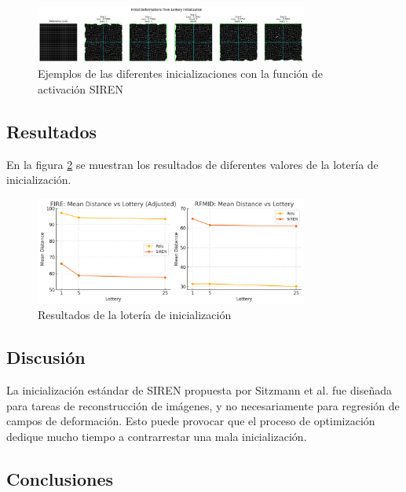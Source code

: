 \begin{figure}[tbp]
    \centering
    \includegraphics[width=0.8\textwidth]{imaxes/lottery/initial_deformations_combinedSIREN.png}
    \caption{Ejemplos de las diferentes inicializaciones con la función de activación SIREN}
    \label{fig:lottery_initial_deformations_combinedSIREN}
\end{figure}

\subsection{Resultados}
\label{subsec:Resultados-initialization}

En la figura \ref{fig:lottery} se muestran los resultados de diferentes valores de la lotería de inicialización.

\begin{figure}[tbp]
    \centering
    \includegraphics[width=0.8\textwidth]{imaxes/lottery/lotery.png}
    \caption{Resultados de la lotería de inicialización}
    \label{fig:lottery}
\end{figure}

\subsection{Discusión}
\label{subsec:Discusion-initialization}

La inicialización estándar de SIREN propuesta por Sitzmann et al. \cite{sitzmann2020implicitneuralrepresentationsperiodic} fue diseñada para tareas de reconstrucción de imágenes, y no necesariamente para regresión de campos de deformación.
Esto puede provocar que el proceso de optimización dedique mucho tiempo a contrarrestar una mala inicialización.

\subsection{Conclusiones}
\label{subsec:Conclusions-initialization}

